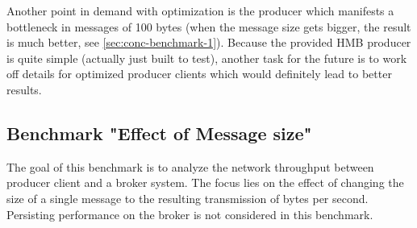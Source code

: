 Another point in demand with optimization is the producer which manifests a
bottleneck in messages of 100 bytes (when the message size gets bigger, the
result is much better, see \ref{sec:conc-benchmark-1}). Because the provided
HMB producer is quite simple (actually just built to test), another task for
the future is to work off details for optimized producer clients which would
definitely lead to better results. 

\newpage
\subsection{Benchmark "Effect of Message size"}
\label{sec:conc-benchmark-2}
The goal of this benchmark is to analyze the network throughput between
producer client and a broker system. The focus lies on the effect of changing the
size of a single message to the resulting transmission of bytes per
second. Persisting performance on the broker is not considered in
this benchmark.

